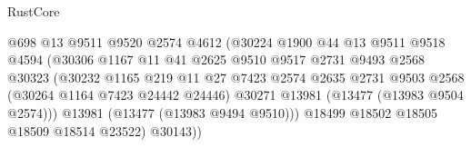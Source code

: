 \begin{lexlean}{RustCore}
\begin{coremodule}
                                            @698
                                            @13
                                            @9511
                                            @9520
                                            @2574
                                            @4612
                                            (@30224
                                              @1900
                                              @44
                                              @13
                                              @9511
                                              @9518
                                              @4594
                                              (@30306
                                                @1167
                                                @11
                                                @41
                                                @2625
                                                @9510
                                                @9517
                                                @2731
                                                @9493
                                                @2568
                                                @30323
                                                (@30232
                                                  @1165
                                                  @219
                                                  @11
                                                  @27
                                                  @7423
                                                  @2574
                                                  @2635
                                                  @2731
                                                  @9503
                                                  @2568
                                                  (@30264 @1164 @7423 @24442 @24446)
                                                  @30271
                                                  @13981
                                                  (@13477 (@13983 @9504 @2574)))
                                                @13981
                                                (@13477 (@13983 @9494 @9510)))
                                              @18499
                                              @18502
                                              @18505
                                              @18509
                                              @18514
                                              @23522)
                                            @30143))

\end{coremodule}
\end{lexlean}
